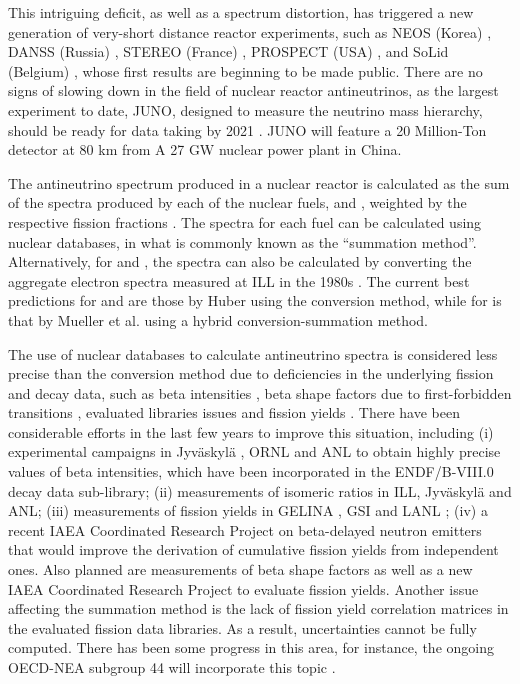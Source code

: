 \documentclass[letterpaper]{ar-1col}
\begin{document}
This intriguing deficit, as well as a spectrum distortion, has triggered a new generation of very-short distance reactor experiments, such as NEOS (Korea) \cite{Ko17}, DANSS (Russia) \cite{AleAx}, STEREO (France) \cite{AllAx}, PROSPECT (USA) \cite{Ash16}, and SoLid (Belgium) \cite{Kal17}, whose first results are beginning to be made public.
 There are no signs of slowing down in the field of nuclear reactor antineutrinos, as the largest experiment to date, JUNO, designed to measure the neutrino mass hierarchy, should be ready for data taking by 2021 \cite{SalAx}.
 JUNO will feature a 20 Million-Ton detector at 80 km from A 27 GW nuclear power plant in China.

The antineutrino spectrum produced in a nuclear reactor is calculated as the sum of the spectra produced by each of the nuclear fuels,  and , weighted by the respective fission fractions \cite{Vog81}.
  The spectra for each fuel can be calculated using nuclear databases, in what is commonly known as the \enquote{summation method}.
  Alternatively, for  and , the spectra can also be calculated by converting the aggregate electron spectra measured at ILL in the 1980s \cite{Fei82,Sch85,Hah89}.
  The current best predictions for   and  are those by Huber \cite{Hub11} using the conversion method, while for  is that by Mueller et al. \cite{Mue11} using a hybrid conversion-summation method.

The use of nuclear databases to calculate antineutrino spectra is considered less precise than the conversion method due to deficiencies in the underlying fission and decay data, such as beta intensities \cite{Fal12}, beta shape factors due to first-forbidden transitions \cite{Hay14}, evaluated libraries issues \cite{Son15} and fission yields \cite{Son16}.
  There have been considerable efforts in the last few years to improve this situation, including (i) experimental campaigns in Jyv\"{a}skyl\"{a} \cite{Alg10}, ORNL \cite{Ras16} and ANL \cite{MccTBD} to obtain highly precise values of beta intensities, which have been incorporated in the ENDF/B-VIII.0 decay data sub-library; (ii) measurements of isomeric ratios in ILL, Jyv\"{a}skyl\"{a} and ANL; (iii) measurements of fission yields in GELINA \cite{Viv00}, GSI \cite{Pel17} and LANL \cite{Duk16}; (iv) a recent IAEA Coordinated Research Project on beta-delayed neutron emitters \cite{DimXX} that would improve the derivation of cumulative fission yields from independent ones.
  Also planned are measurements of beta shape factors as well as a new IAEA Coordinated Research Project to evaluate fission yields.
Another issue affecting the summation method is the lack of fission yield correlation matrices in the evaluated fission data libraries.
  As a result, uncertainties cannot be fully computed.
 There has been some progress in this area, for instance, the ongoing OECD-NEA subgroup 44 will incorporate this topic \cite{SobXX}.
\end{document}
